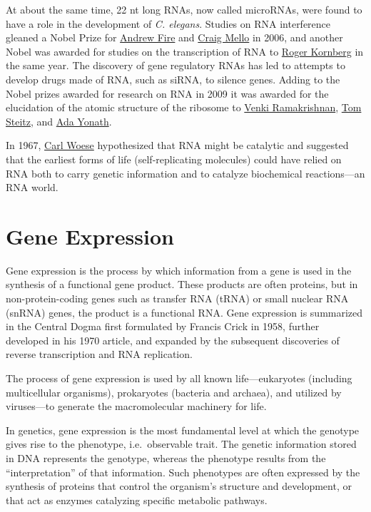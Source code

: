At about the same time, 22 nt long RNAs, now called microRNAs, were found to have a role in the development of \emph{C. elegans}. Studies on RNA interference gleaned a Nobel Prize for \href{https://en.wikipedia.org/wiki/Andrew_Fire}{Andrew Fire} and \href{https://en.wikipedia.org/wiki/Craig_Mello}{Craig Mello} in 2006, and another Nobel was awarded for studies on the transcription of RNA to \href{}{Roger Kornberg} in the same year. The discovery of gene regulatory RNAs has led to attempts to develop drugs made of RNA, such as siRNA, to silence genes. Adding to the Nobel prizes awarded for research on RNA in 2009 it was awarded for the elucidation of the atomic structure of the ribosome to \href{https://en.wikipedia.org/wiki/Venki_Ramakrishnan}{Venki Ramakrishnan}, \href{https://en.wikipedia.org/wiki/Thomas_A._Steitz}{Tom Steitz}, and \href{https://en.wikipedia.org/wiki/Ada_Yonath}{Ada Yonath}.

In 1967, \href{https://en.wikipedia.org/wiki/Carl_Woese}{Carl Woese} hypothesized that RNA might be catalytic and suggested that the earliest forms of life (self-replicating molecules) could have relied on RNA both to carry genetic information and to catalyze biochemical reactions---an RNA world.

\hypertarget{gene-expression}{%
\section{Gene Expression}\label{gene-expression}}

Gene expression is the process by which information from a gene is used in the synthesis of a functional gene product. These products are often proteins, but in non-protein-coding genes such as transfer RNA (tRNA) or small nuclear RNA (snRNA) genes, the product is a functional RNA. Gene expression is summarized in the Central Dogma first formulated by Francis Crick in 1958, further developed in his 1970 article, and expanded by the subsequent discoveries of reverse transcription and RNA replication.

The process of gene expression is used by all known life---eukaryotes (including multicellular organisms), prokaryotes (bacteria and archaea), and utilized by viruses---to generate the macromolecular machinery for life.

In genetics, gene expression is the most fundamental level at which the genotype gives rise to the phenotype, i.e.~observable trait. The genetic information stored in DNA represents the genotype, whereas the phenotype results from the ``interpretation'' of that information. Such phenotypes are often expressed by the synthesis of proteins that control the organism's structure and development, or that act as enzymes catalyzing specific metabolic pathways.

